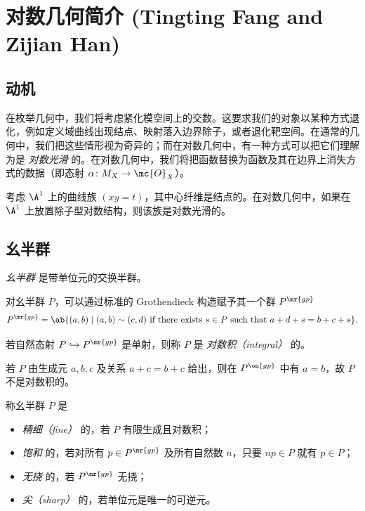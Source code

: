 \section{对数几何简介 (Tingting Fang and Zijian Han)}%
\label{sec:Intro to log geometry (Tingting Fang and Zijian Han)}

\subsection{动机}%
\label{sub:Motivation}

在枚举几何中，我们将考虑紧化模空间上的交数。这要求我们的对象以某种方式退化，例如定义域曲线出现结点、映射落入边界除子，或者退化靶空间。在通常的几何中，我们把这些情形视为奇异的；而在对数几何中，有一种方式可以把它们理解为是 \textit{对数光滑} 的。在对数几何中，我们将把函数替换为函数及其在边界上消失方式的数据（即态射 \(\alpha \colon M_X \to \mc{O}_X\)）。

\begin{exm}
    考虑 \(\A^1\) 上的曲线族 \((xy=t)\)，其中心纤维是结点的。在对数几何中，如果在 \(\A^1\) 上放置除子型对数结构，则该族是对数光滑的。
\end{exm}

\subsection{幺半群}%
\label{sub:Monoids}

\begin{defn}
    \textit{幺半群} 是带单位元的交换半群。 
\end{defn}

对幺半群 \(P\)，可以通过标准的 Grothendieck 构造赋予其一个群 \(P^{\mr{gp}}\)
\[ P^{\mr{gp}} = \ab\{(a,b) \mid (a,b) \sim (c,d) \text{ if there exists } s \in P \text{ such that } a+d+s = b+c+s \}. \]
\begin{defn}
若自然态射 \(P \hookrightarrow P^{\mr{gp}}\) 是单射，则称 \(P\) 是 \textit{对数积（integral）} 的。
\end{defn}

\begin{exm}
    若 \(P\) 由生成元 \(a,b,c\) 及关系 \(a+c=b+c\) 给出，则在 \(P^{\on{gp}}\) 中有 \(a = b\)，故 \(P\) 不是对数积的。
\end{exm}

\begin{defn}
    称幺半群 \(P\) 是
    \begin{itemize}
        \item \textit{精细（fine）} 的，若 \(P\) 有限生成且对数积；
        \item \textit{饱和} 的，若对所有 \(p \in P^{\mr{gp}}\) 及所有自然数 \(n\)，只要 \(np \in P\) 就有 \(p \in P\)；
        \item \textit{无挠} 的，若 \(P^{\mr{gp}}\) 无挠；
        \item \textit{尖（sharp）} 的，若单位元是唯一的可逆元。
    \end{itemize}
\end{defn}


